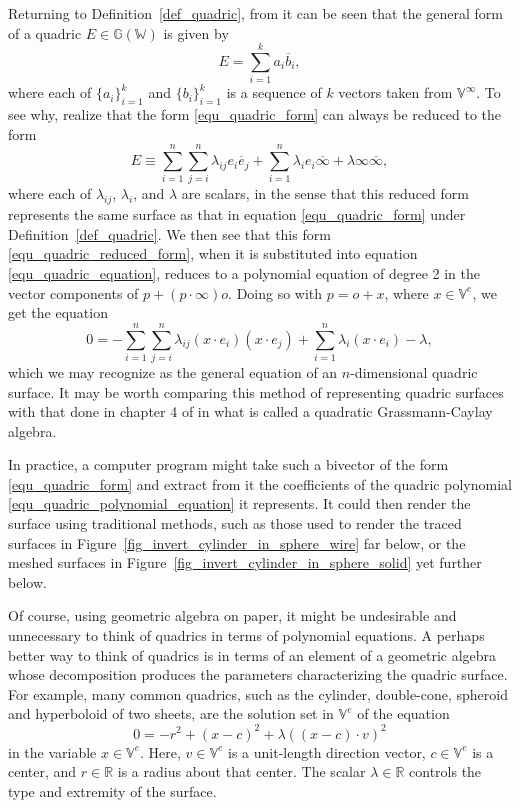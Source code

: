 \documentclass{birkjour}
\theoremstyle{definition}
\theoremstyle{remark}
\numberwithin{equation}{section}
\newcommand{\G}{\mathbb{G}}
\newcommand{\V}{\mathbb{V}}
\newcommand{\W}{\mathbb{W}}
\newcommand{\R}{\mathbb{R}}
\newcommand{\nvao}{o}
\newcommand{\nvai}{\infty}
\newcommand{\nvaib}{\overline{\infty}}
\begin{document}
Returning to Definition~\ref{def_quadric}, from it can be seen that the general
form of a quadric $E\in\G(\W)$ is given by
\begin{equation}\label{equ_quadric_form}
E = \sum_{i=1}^k a_i\overline{b}_i,
\end{equation}
where each of $\{a_i\}_{i=1}^k$ and $\{b_i\}_{i=1}^k$ is a sequence of $k$ vectors
taken from $\V^\nvai$.  To see why, realize that the form \eqref{equ_quadric_form} can
always be reduced to the form
\begin{equation}\label{equ_quadric_reduced_form}
E \equiv \sum_{i=1}^n\sum_{j=i}^n\lambda_{ij}e_i\overline{e}_j+
\sum_{i=1}^n\lambda_i e_i\nvaib+
\lambda\nvai\nvaib,
\end{equation}
where each of $\lambda_{ij}$, $\lambda_i$, and $\lambda$ are scalars, in the
sense that this reduced form represents the same surface as that in equation \eqref{equ_quadric_form}
under Definition~\ref{def_quadric}.
We then see that this form \eqref{equ_quadric_reduced_form}, when it is
substituted into equation \eqref{equ_quadric_equation}, reduces to a polynomial
equation of degree 2 in the vector components of $p+(p\cdot\nvai)\nvao$.
Doing so with $p=\nvao+x$, where $x\in\V^e$, we get the equation
\begin{equation}\label{equ_quadric_polynomial_equation}
0 = -\sum_{i=1}^n\sum_{j=i}^n\lambda_{ij}(x\cdot e_i)(x\cdot e_j)
+\sum_{i=1}^n\lambda_i(x\cdot e_i) - \lambda,
\end{equation}
which we may recognize as the general equation of an $n$-dimensional quadric surface.
It may be worth comparing this method of representing quadric surfaces with that done
in chapter 4 of \cite{Li08} in what is called a quadratic Grassmann-Caylay algebra.

In practice, a computer program might take such a bivector of the form \eqref{equ_quadric_form}
and extract from it the coefficients of the quadric
polynomial \eqref{equ_quadric_polynomial_equation} it
represents.  It could then render the surface using traditional methods, such as those used
to render the traced surfaces in Figure~\ref{fig_invert_cylinder_in_sphere_wire} far below,
or the meshed surfaces in Figure~\ref{fig_invert_cylinder_in_sphere_solid} yet further below.

Of course, using geometric algebra on paper, it might be undesirable and unnecessary to think of
quadrics in terms of polynomial equations.  A perhaps better way to think of quadrics is in terms
of an element of a geometric algebra whose decomposition
produces the parameters characterizing the quadric surface.  For example, many common
quadrics, such as the cylinder, double-cone, spheroid and hyperboloid of two sheets, are the
solution set in $\V^e$ of the equation
\begin{equation}\label{equ_common_quadric}
0 = -r^2 + (x-c)^2 + \lambda((x-c)\cdot v)^2
\end{equation}
in the variable $x\in\V^e$.  Here, $v\in\V^e$ is a unit-length direction
vector, $c\in\V^e$ is a center, and $r\in\R$ is a radius about that center.
The scalar $\lambda\in\R$ controls the type and
extremity of the surface.
\end{document}
